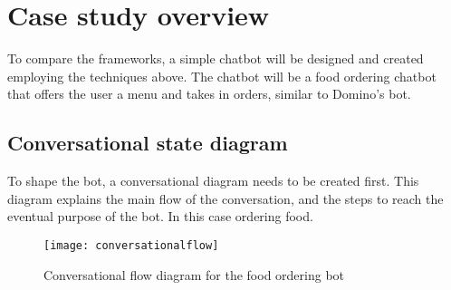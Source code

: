 \chapter{Case study overview}

To compare the frameworks, a simple chatbot will be designed and created employing the techniques above. The chatbot will be a food ordering chatbot that offers the user a menu and takes in orders, similar to Domino's bot.

\section{Conversational state diagram}

To shape the bot, a conversational diagram needs to be created first. This diagram explains the main flow of the conversation, and the steps to reach the eventual purpose of the bot. In this case ordering food.

\begin{figure}[p]
	\centering
	\texttt{[image: conversationalflow]}\label{fig:conversationalflow}
	\caption{Conversational flow diagram for the food ordering bot~}
\end{figure}
